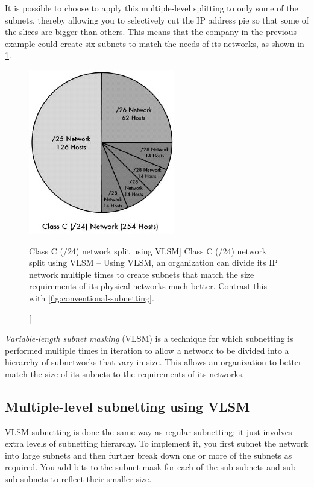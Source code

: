It is possible to choose to apply this multiple-level splitting to only
some of the subnets, thereby allowing you to selectively cut the IP address pie so that some of the slices are bigger than others.
This means that the company in the previous example could create six subnets to match the needs of its networks, as shown in \cref{fig:vlsm}.


\begin{figure}
   \centering
   \includegraphics[width=.4\textwidth]{images/vlsm.jpg}
   \caption
      [Class C (/24) network split using VLSM]
      {Class C (/24) network split using VLSM -- 
      Using VLSM, an organization can divide its IP network multiple times to create subnets that match the size requirements of its physical networks much better.
      Contrast this with \cref{fig:conventional-subnetting}.}
   \label{fig:vlsm}
\end{figure}


\begin{keyconcept}
\emph{Variable-length subnet masking} (VLSM) is a technique for which subnetting is performed multiple times in iteration to allow a
network to be divided into a hierarchy of subnetworks that vary in size.
This allows an organization to better match the size of its subnets to the requirements of its networks.
\end{keyconcept}


\subsection{Multiple-level subnetting using VLSM}

VLSM subnetting is done the same way as regular subnetting; it just involves extra levels of subnetting hierarchy.
To implement it, you first subnet the network into large subnets and then further break down one or more of the subnets as required.
You add bits to the subnet mask for each of the sub-subnets and sub-sub-subnets to reflect their smaller size.

